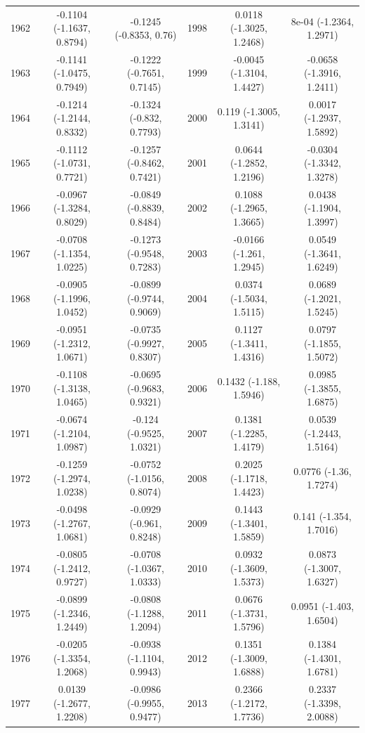 \documentclass[
  12pt,
]{report}
\begin{document}
\begin{table}[!h]
\begin{tabular}[t]{ccc|>{}ccc}
1962 & -0.1104 (-1.1637, 0.8794) & -0.1245 (-0.8353, 0.76) & 1998 & 0.0118 (-1.3025, 1.2468) & 8e-04 (-1.2364, 1.2971)\\
1963 & -0.1141 (-1.0475, 0.7949) & -0.1222 (-0.7651, 0.7145) & 1999 & -0.0045 (-1.3104, 1.4427) & -0.0658 (-1.3916, 1.2411)\\
1964 & -0.1214 (-1.2144, 0.8332) & -0.1324 (-0.832, 0.7793) & 2000 & 0.119 (-1.3005, 1.3141) & 0.0017 (-1.2937, 1.5892)\\
1965 & -0.1112 (-1.0731, 0.7721) & -0.1257 (-0.8462, 0.7421) & 2001 & 0.0644 (-1.2852, 1.2196) & -0.0304 (-1.3342, 1.3278)\\
1966 & -0.0967 (-1.3284, 0.8029) & -0.0849 (-0.8839, 0.8484) & 2002 & 0.1088 (-1.2965, 1.3665) & 0.0438 (-1.1904, 1.3997)\\
1967 & -0.0708 (-1.1354, 1.0225) & -0.1273 (-0.9548, 0.7283) & 2003 & -0.0166 (-1.261, 1.2945) & 0.0549 (-1.3641, 1.6249)\\
1968 & -0.0905 (-1.1996, 1.0452) & -0.0899 (-0.9744, 0.9069) & 2004 & 0.0374 (-1.5034, 1.5115) & 0.0689 (-1.2021, 1.5245)\\
1969 & -0.0951 (-1.2312, 1.0671) & -0.0735 (-0.9927, 0.8307) & 2005 & 0.1127 (-1.3411, 1.4316) & 0.0797 (-1.1855, 1.5072)\\
1970 & -0.1108 (-1.3138, 1.0465) & -0.0695 (-0.9683, 0.9321) & 2006 & 0.1432 (-1.188, 1.5946) & 0.0985 (-1.3855, 1.6875)\\
1971 & -0.0674 (-1.2104, 1.0987) & -0.124 (-0.9525, 1.0321) & 2007 & 0.1381 (-1.2285, 1.4179) & 0.0539 (-1.2443, 1.5164)\\
1972 & -0.1259 (-1.2974, 1.0238) & -0.0752 (-1.0156, 0.8074) & 2008 & 0.2025 (-1.1718, 1.4423) & 0.0776 (-1.36, 1.7274)\\
1973 & -0.0498 (-1.2767, 1.0681) & -0.0929 (-0.961, 0.8248) & 2009 & 0.1443 (-1.3401, 1.5859) & 0.141 (-1.354, 1.7016)\\
1974 & -0.0805 (-1.2412, 0.9727) & -0.0708 (-1.0367, 1.0333) & 2010 & 0.0932 (-1.3609, 1.5373) & 0.0873 (-1.3007, 1.6327)\\
1975 & -0.0899 (-1.2346, 1.2449) & -0.0808 (-1.1288, 1.2094) & 2011 & 0.0676 (-1.3731, 1.5796) & 0.0951 (-1.403, 1.6504)\\
1976 & -0.0205 (-1.3354, 1.2068) & -0.0938 (-1.1104, 0.9943) & 2012 & 0.1351 (-1.3009, 1.6888) & 0.1384 (-1.4301, 1.6781)\\
1977 & 0.0139 (-1.2677, 1.2208) & -0.0986 (-0.9955, 0.9477) & 2013 & 0.2366 (-1.2172, 1.7736) & 0.2337 (-1.3398, 2.0088)\\

\end{tabular}
\end{table}
\end{document}
